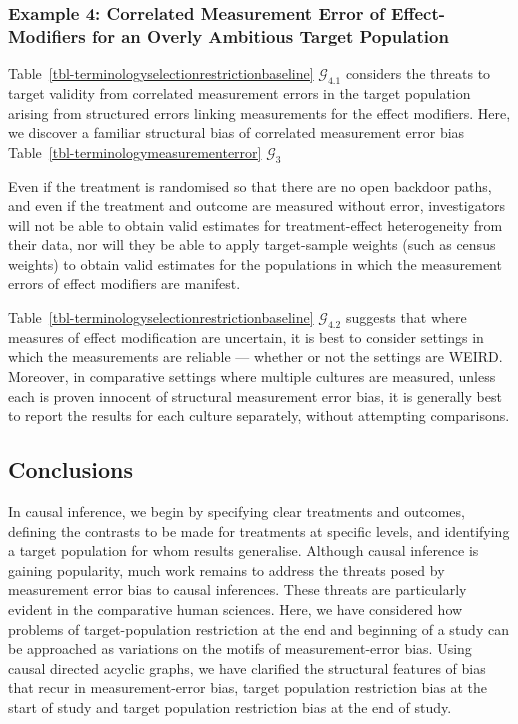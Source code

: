 \documentclass[
  single column]{article}
\begin{document}
\subsubsection{Example 4: Correlated Measurement Error of
Effect-Modifiers for an Overly Ambitious Target
Population}\label{example-4-correlated-measurement-error-of-effect-modifiers-for-an-overly-ambitious-target-population}

Table~\ref{tbl-terminologyselectionrestrictionbaseline}
\(\mathcal{G}_{4.1}\) considers the threats to target validity from
correlated measurement errors in the target population arising from
structured errors linking measurements for the effect modifiers. Here,
we discover a familiar structural bias of correlated measurement error
bias Table~\ref{tbl-terminologymeasurementerror} \(\mathcal{G}_3\)

Even if the treatment is randomised so that there are no open backdoor
paths, and even if the treatment and outcome are measured without error,
investigators will not be able to obtain valid estimates for
treatment-effect heterogeneity from their data, nor will they be able to
apply target-sample weights (such as census weights) to obtain valid
estimates for the populations in which the measurement errors of effect
modifiers are manifest.

Table~\ref{tbl-terminologyselectionrestrictionbaseline}
\(\mathcal{G}_{4.2}\) suggests that where measures of effect
modification are uncertain, it is best to consider settings in which the
measurements are reliable --- whether or not the settings are WEIRD.
Moreover, in comparative settings where multiple cultures are measured,
unless each is proven innocent of structural measurement error bias, it
is generally best to report the results for each culture separately,
without attempting comparisons.

\subsection{Conclusions}\label{conclusions}

In causal inference, we begin by specifying clear treatments and
outcomes, defining the contrasts to be made for treatments at specific
levels, and identifying a target population for whom results generalise.
Although causal inference is gaining popularity, much work remains to
address the threats posed by measurement error bias to causal
inferences. These threats are particularly evident in the comparative
human sciences. Here, we have considered how problems of
target-population restriction at the end and beginning of a study can be
approached as variations on the motifs of measurement-error bias. Using
causal directed acyclic graphs, we have clarified the structural
features of bias that recur in measurement-error bias, target population
restriction bias at the start of study and target population restriction
bias at the end of study.
\end{document}
